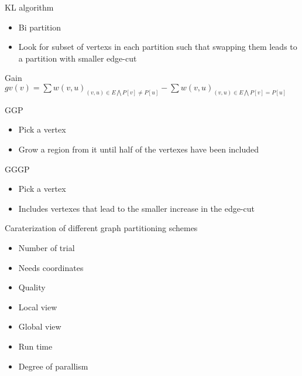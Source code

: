 \documentclass{beamer}
\begin{document}
\begin{frame}{KL algorithm}
	\begin{itemize}
		\item Bi partition
		\item Look for subset of vertexs in each partition such that swapping them leads to a partition with smaller edge-cut
	\end{itemize}
	\begin{block}{Gain}
		 $gv(v) = \sum w(v,u)_{(v,u)\in E\bigwedge P[v]\neq P[u]} - \sum w(v,u)_{(v,u)\in E\bigwedge P[v]= P[u] }$
	\end{block}
\end{frame}





\begin{frame}{GGP}
\begin{itemize}
\item Pick a vertex
\item Grow a region from it until half of the vertexes have been included
\end{itemize}
\end{frame}
\begin{frame}{GGGP}
\begin{itemize}
\item Pick a vertex
\item Includes vertexes that lead
to the smaller increase in the edge-cut
\end{itemize}
\end{frame}


\begin{frame}{Caraterization of different graph partitioning schemes}
\begin{itemize}
\item Number of trial
\item Needs coordinates
\item Quality
\item Local view
\item Global view
\item Run time
\item Degree of parallism
\end{itemize}
\end{frame}
\end{document}
